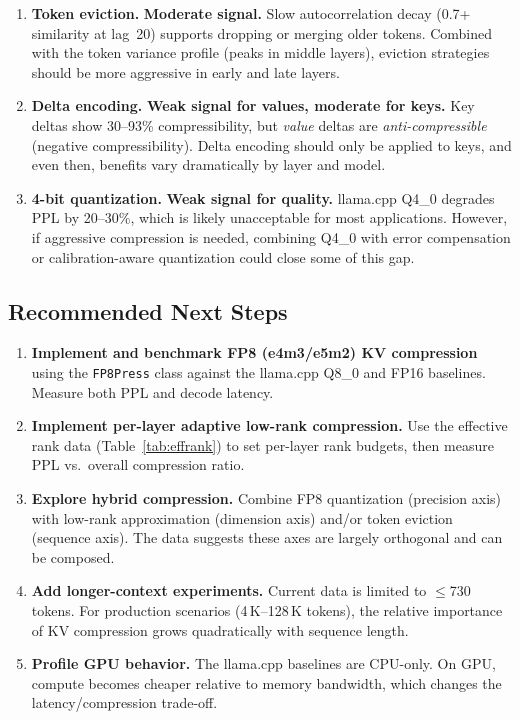 \documentclass[11pt,a4paper]{article}
\begin{document}
\begin{enumerate}[itemsep=4pt]
  \item \textbf{Token eviction.} \textbf{Moderate signal.} Slow
        autocorrelation decay (0.7+ similarity at lag~20) supports
        dropping or merging older tokens. Combined with the token
        variance profile (peaks in middle layers), eviction strategies
        should be more aggressive in early and late layers.

  \item \textbf{Delta encoding.} \textbf{Weak signal for values,
        moderate for keys.} Key deltas show 30--93\% compressibility,
        but \emph{value} deltas are \emph{anti-compressible}
        (negative compressibility). Delta encoding should only be
        applied to keys, and even then, benefits vary dramatically
        by layer and model.

  \item \textbf{4-bit quantization.} \textbf{Weak signal for quality.}
        llama.cpp Q4\_0 degrades PPL by 20--30\%, which is likely
        unacceptable for most applications. However, if aggressive
        compression is needed, combining Q4\_0 with error compensation
        or calibration-aware quantization could close some of this gap.
\end{enumerate}

\subsection{Recommended Next Steps}

\begin{enumerate}[itemsep=3pt]
  \item \textbf{Implement and benchmark FP8 (e4m3/e5m2) KV compression}
        using the \texttt{FP8Press} class against the llama.cpp Q8\_0
        and FP16 baselines. Measure both PPL and decode latency.
  \item \textbf{Implement per-layer adaptive low-rank compression.}
        Use the effective rank data (Table~\ref{tab:effrank}) to set
        per-layer rank budgets, then measure PPL vs.\ overall
        compression ratio.
  \item \textbf{Explore hybrid compression.} Combine FP8 quantization
        (precision axis) with low-rank approximation (dimension axis)
        and/or token eviction (sequence axis). The data suggests these
        axes are largely orthogonal and can be composed.
  \item \textbf{Add longer-context experiments.} Current data is limited
        to $\leq$730 tokens. For production scenarios (4\,K--128\,K
        tokens), the relative importance of KV compression grows
        quadratically with sequence length.
  \item \textbf{Profile GPU behavior.} The llama.cpp baselines are
        CPU-only. On GPU, compute becomes cheaper relative to memory
        bandwidth, which changes the latency/compression trade-off.
\end{enumerate}
\end{document}
